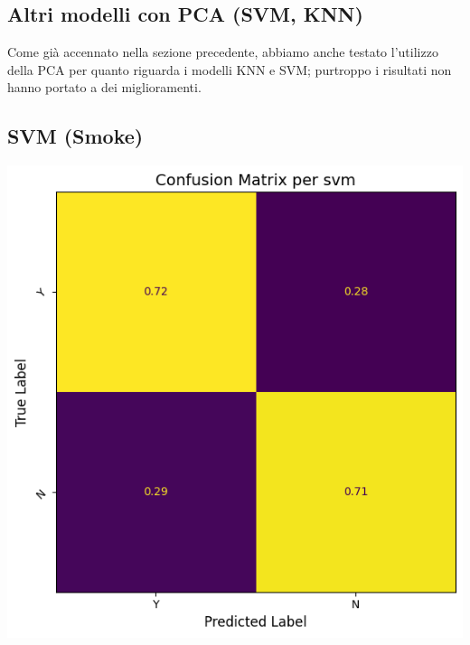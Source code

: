 \subsection{Altri modelli con PCA (SVM, KNN)}
Come già accennato nella sezione precedente, abbiamo anche testato l'utilizzo della PCA per quanto riguarda i modelli KNN e SVM; purtroppo i risultati non hanno portato a dei miglioramenti.

\subsection*{SVM (Smoke) }
\begin{center}
\begin{minipage}[c]{0.50\columnwidth}
\end{minipage}\hspace{\columnsep}%
\begin{minipage}[c]{0.40\columnwidth}
\centering
\includegraphics[width=\columnwidth,height=0.75\columnwidth,keepaspectratio]{screen_results/confusion_matrix_svm_pca_d.png} %
\end{minipage}
\end{center}

